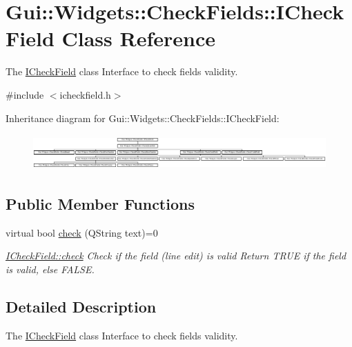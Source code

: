 \hypertarget{classGui_1_1Widgets_1_1CheckFields_1_1ICheckField}{\section{Gui\-:\-:Widgets\-:\-:Check\-Fields\-:\-:I\-Check\-Field Class Reference}
\label{classGui_1_1Widgets_1_1CheckFields_1_1ICheckField}
}


The \hyperlink{classGui_1_1Widgets_1_1CheckFields_1_1ICheckField}{I\-Check\-Field} class Interface to check fields validity.  




{\ttfamily \#include $<$icheckfield.\-h$>$}

Inheritance diagram for Gui\-:\-:Widgets\-:\-:Check\-Fields\-:\-:I\-Check\-Field\-:\begin{figure}[H]
\begin{center}
\leavevmode
\includegraphics[height=1.374570cm]{d7/d93/classGui_1_1Widgets_1_1CheckFields_1_1ICheckField}
\end{center}
\end{figure}
\subsection*{Public Member Functions}
\begin{DoxyCompactItemize}
\item 
virtual bool \hyperlink{classGui_1_1Widgets_1_1CheckFields_1_1ICheckField_a818700a4a8c95eacfc39b85c74e71144}{check} (Q\-String text)=0
\begin{DoxyCompactList}\small\item\em \hyperlink{classGui_1_1Widgets_1_1CheckFields_1_1ICheckField_a818700a4a8c95eacfc39b85c74e71144}{I\-Check\-Field\-::check} Check if the field (line edit) is valid Return T\-R\-U\-E if the field is valid, else F\-A\-L\-S\-E. \end{DoxyCompactList}\end{DoxyCompactItemize}


\subsection{Detailed Description}
The \hyperlink{classGui_1_1Widgets_1_1CheckFields_1_1ICheckField}{I\-Check\-Field} class Interface to check fields validity. 

